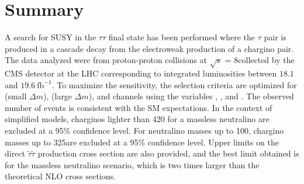 \section{Summary}
\label{sect:conclusion}
A search for SUSY in the $\tau\tau$ final state has been performed where the
$\tau$ pair is produced in a cascade decay from the electroweak production of a chargino pair.  The data analyzed were from proton-proton collisions
at $\sqrt{s}$ = 8\TeV collected by the CMS detector at the LHC corresponding to integrated luminosities between $18.1$ and $19.6~\mathrm{fb}^{-1}$. 
To maximize the sensitivity, the selection criteria are optimized for \tauTau (small $\Delta m$), 
\tauTau (large $\Delta m$), and \leptonTau channels using the variables \mttwo, \tauMT, and \SumMT.
The observed number of events is consistent with the SM expectations. 
In the context of simplified models, charginos lighter than 420\GeV 
for a massless neutralino are excluded at a 95\% confidence level. 
For neutralino masses up to 100\GeV, chargino masses up to 325\GeV are excluded
at a 95\% confidence level.
Upper limits on the direct $\tilde{\tau}\tilde{\tau}$ production cross section are also provided, 
and the best limit obtained is for the massless neutralino scenario, which is two times
larger than the theoretical NLO cross sections. 

